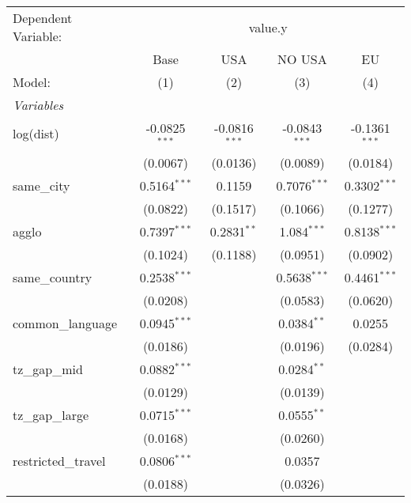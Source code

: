 
\begingroup
\centering
\begin{tabular}{lcccc}
   \tabularnewline \midrule \midrule
   Dependent Variable: & \multicolumn{4}{c}{value.y}\\
                       & Base            & USA             & NO USA          & EU \\   
   Model:              & (1)             & (2)             & (3)             & (4)\\  
   \midrule
   \emph{Variables}\\
   log(dist)           & -0.0825$^{***}$ & -0.0816$^{***}$ & -0.0843$^{***}$ & -0.1361$^{***}$\\   
                       & (0.0067)        & (0.0136)        & (0.0089)        & (0.0184)\\   
   same\_city          & 0.5164$^{***}$  & 0.1159          & 0.7076$^{***}$  & 0.3302$^{***}$\\   
                       & (0.0822)        & (0.1517)        & (0.1066)        & (0.1277)\\   
   agglo               & 0.7397$^{***}$  & 0.2831$^{**}$   & 1.084$^{***}$   & 0.8138$^{***}$\\   
                       & (0.1024)        & (0.1188)        & (0.0951)        & (0.0902)\\   
   same\_country       & 0.2538$^{***}$  &                 & 0.5638$^{***}$  & 0.4461$^{***}$\\   
                       & (0.0208)        &                 & (0.0583)        & (0.0620)\\   
   common\_language    & 0.0945$^{***}$  &                 & 0.0384$^{**}$   & 0.0255\\   
                       & (0.0186)        &                 & (0.0196)        & (0.0284)\\   
   tz\_gap\_mid        & 0.0882$^{***}$  &                 & 0.0284$^{**}$   &   \\   
                       & (0.0129)        &                 & (0.0139)        &   \\   
   tz\_gap\_large      & 0.0715$^{***}$  &                 & 0.0555$^{**}$   &   \\   
                       & (0.0168)        &                 & (0.0260)        &   \\   
   restricted\_travel  & 0.0806$^{***}$  &                 & 0.0357          &   \\   
                       & (0.0188)        &                 & (0.0326)        &   \\   

\end{tabular}
